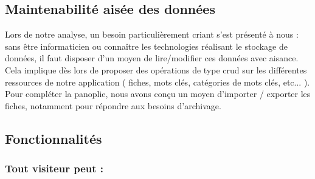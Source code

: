 \subsection*{Maintenabilité aisée des données}

Lors de notre analyse, un besoin particulièrement criant s'est présenté à nous : sans être informaticien ou connaître les technologies réalisant le stockage de données, il faut disposer d'un moyen de lire/modifier ces données avec aisance. \\

Cela implique dès lors de proposer des opérations de type \Gls{crud} sur les différentes ressources de notre application ( fiches, mots clés, catégories de mots clés, etc... ). Pour compléter la panoplie, nous avons conçu un moyen d'importer / exporter les fiches, notamment pour répondre aux besoins d'archivage.

\pagebreak

\subsection*{Fonctionnalités}

\subsubsection*{Tout visiteur peut : }

